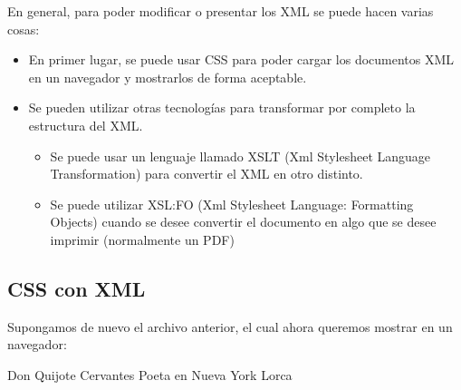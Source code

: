 \documentclass[letterpaper,10pt,spanish]{sphinxmanual}
\begin{document}
En general, para poder modificar o presentar los XML se puede hacen varias cosas:
\begin{itemize}
\item {} 
En primer lugar, se puede usar CSS para poder cargar los documentos XML en un navegador y mostrarlos de forma aceptable.

\item {} 
Se pueden utilizar otras tecnologías para transformar por completo la estructura del XML.
\begin{itemize}
\item {} 
Se puede usar un lenguaje llamado XSLT (Xml Stylesheet Language Transformation) para convertir el XML en otro distinto.

\item {} 
Se puede utilizar XSL:FO (Xml Stylesheet Language: Formatting Objects) cuando se desee convertir el documento en algo que se desee imprimir (normalmente un PDF)

\end{itemize}

\end{itemize}


\subsection{CSS con XML}
\label{\detokenize{tema7:css-con-xml}}
Supongamos de nuevo el archivo anterior, el cual ahora queremos mostrar en un navegador:

\begin{sphinxVerbatim}[commandchars=\\\{\}]
                Don Quijote
                Cervantes
                Poeta en Nueva York
                Lorca
\end{sphinxVerbatim}
\end{document}
